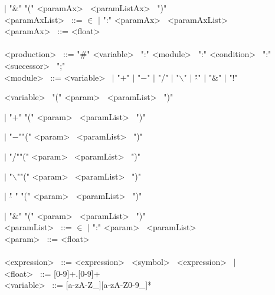 \hspace{1cm} $|$ "$\&$" "("  \textless paramAx\textgreater~ \textless paramListAx\textgreater~ ")" \\
\textless paramAxList\textgreater~ ::=  $\in$ $|$ ":" \textless paramAx\textgreater~ \textless paramAxList\textgreater~ \\
\textless paramAx\textgreater~ ::= \textless float\textgreater~ \\
\\
\textless production\textgreater~ ::=  "\#" \textless variable\textgreater~  ":" \textless module\textgreater~ ":" \textless condition\textgreater~  ":" \textless successor\textgreater~ ";"\\
\textless module\textgreater~ ::=  \textless variable\textgreater~ $|$ "$+$" $|$ "$-$" $|$ "/" $|$ "$\backslash$" $|$ "$\hat{}$" $|$ "$\&$" $|$ "!" 

\hspace{1cm} \textless variable\textgreater~ "("  \textless param\textgreater~ \textless paramList\textgreater~ ")"

\hspace{1cm} $|$ "$+$" "("  \textless param\textgreater~ \textless paramList\textgreater~ ")" 

\hspace{1cm} $|$ "$-$""("  \textless param\textgreater~ \textless paramList\textgreater~ ")" 

\hspace{1cm} $|$ "/""("  \textless param\textgreater~ \textless paramList\textgreater~ ")" 

\hspace{1cm} $|$ "$\backslash$""("  \textless param\textgreater~ \textless paramList\textgreater~ ")" 

\hspace{1cm} $|$ "$\hat{}$ " "("  \textless param\textgreater~ \textless paramList\textgreater~ ")" 

\hspace{1cm} $|$ "$\&$" "("  \textless param\textgreater~ \textless paramList\textgreater~ ")" \\
\textless paramList\textgreater~ ::=  $\in$ $|$ ":" \textless param\textgreater~ \textless paramList\textgreater~ \\
\textless param\textgreater~ ::= \textless float\textgreater~ \\
\\
\textless expression\textgreater~ ::=  \textless expression\textgreater~ \textless symbol\textgreater~ \textless expression\textgreater~ $|$ 
\\
\textless float\textgreater~ ::= [0-9]+.[0-9]+ \\
\textless variable\textgreater~ ::= [a-zA-Z\_][a-zA-Z0-9\_]* \\



